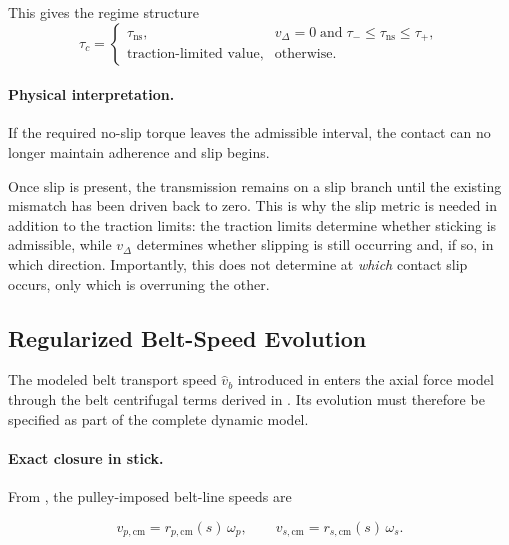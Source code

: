 \documentclass[11pt]{article}
\numberwithin{equation}{section}
\begin{document}
This gives the regime structure
\begin{equation}
\tau_c =
\begin{cases}
\tau_{\mathrm{ns}},
&
v_{\Delta}=0
\;\text{and}\;
\tau_- \le \tau_{\mathrm{ns}} \le \tau_+,
\\[10pt]
\text{traction-limited value},
&
\text{otherwise}.
\end{cases}
\label{eq:tau_c_regime_structure}
\end{equation}

\paragraph{Physical interpretation.}

If the required no-slip torque leaves the admissible interval, the contact can
no longer maintain adherence and slip begins.

Once slip is present, the transmission remains on a slip branch until the
existing mismatch has been driven back to zero.
This is why the slip metric is needed in addition to the traction limits:
the traction limits determine whether sticking is admissible, while
$v_{\Delta}$ determines whether slipping is still occurring and, if so, in which
direction. Importantly, this does not determine at \emph{which} contact slip occurs,
only which is overruning the other.


\subsection{Regularized Belt-Speed Evolution}
\label{sec:belt_speed_evolution}

The modeled belt transport speed $\hat{v}_b$ introduced in
 enters the axial force model through the
belt centrifugal terms derived in .
Its evolution must therefore be specified as part of the complete dynamic model.

\paragraph{Exact closure in stick.}

From , the pulley-imposed belt-line speeds are

\[
v_{p,\mathrm{cm}} = r_{p,\mathrm{cm}}(s)\,\omega_p,
\qquad
v_{s,\mathrm{cm}} = r_{s,\mathrm{cm}}(s)\,\omega_s.
\]
\end{document}
